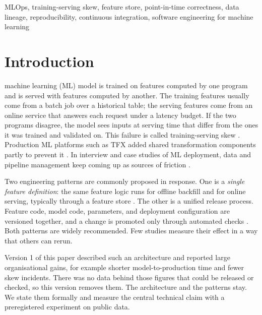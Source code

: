 \documentclass[journal]{IEEEtran}
\begin{document}
\begin{IEEEkeywords}
MLOps, training-serving skew, feature store, point-in-time correctness, data lineage, reproducibility, continuous integration, software engineering for machine learning
\end{IEEEkeywords}

\IEEEpeerreviewmaketitle

\section{Introduction}
\label{sec:intro}

 machine learning (ML) model is trained on features computed by one program and is served with features computed by another. The training features usually come from a batch job over a historical table; the serving features come from an online service that answers each request under a latency budget. If the two programs disagree, the model sees inputs at serving time that differ from the ones it was trained and validated on. This failure is called training-serving skew \cite{polyzotis2018lifecycle,breck2017mltestscore}. Production ML platforms such as TFX added shared transformation components partly to prevent it \cite{baylor2017tfx}. In interview and case studies of ML deployment, data and pipeline management keep coming up as sources of friction \cite{amershi2019se4ml,paleyes2022challenges,shankar2022interview,lwakatare2020largescale}.

Two engineering patterns are commonly proposed in response. One is a \emph{single feature definition}: the same feature logic runs for offline backfill and for online serving, typically through a feature store \cite{orr2021featurestores,feast}. The other is a unified release process. Feature code, model code, parameters, and deployment configuration are versioned together, and a change is promoted only through automated checks \cite{kreuzberger2023mlops,opengitops}. Both patterns are widely recommended. Few studies measure their effect in a way that others can rerun.

Version 1 of this paper described such an architecture and reported large organisational gains, for example shorter model-to-production time and fewer skew incidents. There was no data behind those figures that could be released or checked, so this version removes them. The architecture and the patterns stay. We state them formally and measure the central technical claim with a preregistered experiment on public data.
\end{document}
